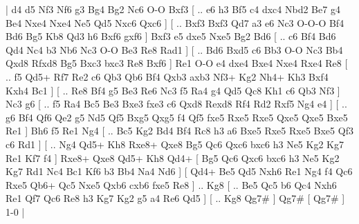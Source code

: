 \makegametitle 
|   d4   d5    Nf3   Nf6    g3   Bg4    Bg2   Nc6    O-O   Bxf3 [ .. e6  h3 Bf5  c4 dxc4  Nbd2 Be7  g4 Be4  Nxe4 Nxe4  Ne5 Qd5  Nxc6 Qxc6   ]  [ .. Bxf3  Bxf3 Qd7  a3 e6  Nc3 O-O-O  Bf4 Bd6  Bg5 Kb8  Qd3 h6  Bxf6 gxf6   ]  Bxf3   e5    dxe5   Nxe5    Bg2   Bd6 [ .. c6  Bf4 Bd6  Qd4 Nc4  b3 Nb6  Nc3 O-O  Be3 Re8  Rad1   ]  [ .. Bd6  Bxd5 c6  Bb3 O-O  Nc3 Bb4  Qxd8 Rfxd8  Bg5 Bxc3  bxc3 Re8  Bxf6   ]  Re1   O-O    e4   dxe4    Bxe4   Nxe4    Rxe4   Re8 [ .. f5  Qd5+ Rf7  Re2 c6  Qb3 Qb6  Bf4 Qxb3  axb3 Nf3+  Kg2 Nh4+  Kh3 Bxf4  Kxh4 Bc1   ]  [ .. Re8  Bf4 g5  Be3 Re6  Nc3 f5  Ra4 g4  Qd5 Qc8  Kh1 c6  Qb3 Nf3   ]  Nc3   g6 [ .. f5  Ra4 Bc5  Be3 Bxe3  fxe3 c6  Qxd8 Rexd8  Rf4 Rd2  Rxf5 Ng4  e4   ]  [ .. g6  Bf4 Qf6  Qe2 g5  Nd5 Qf5  Bxg5 Qxg5  f4 Qf5  fxe5 Rxe5  Rxe5 Qxe5  Qxe5 Bxe5  Re1   ]  Bh6   f5    Re1   Ng4 [ .. Bc5  Kg2 Bd4  Bf4 Rc8  h3 a6  Bxe5 Rxe5  Rxe5 Bxe5  Qf3 c6  Rd1   ]  [ .. Ng4  Qd5+ Kh8  Rxe8+ Qxe8  Bg5 Qc6  Qxc6 bxc6  h3 Ne5  Kg2 Kg7  Re1 Kf7  f4   ]  Rxe8+   Qxe8    Qd5+   Kh8    Qd4+ [  Bg5 Qc6  Qxc6 bxc6  h3 Ne5  Kg2 Kg7  Rd1 Nc4  Bc1 Kf6  b3 Bb4  Na4 Nd6   ]  [  Qd4+ Be5  Qd5 Nxh6  Re1 Ng4  f4 Qc6  Rxe5 Qb6+  Qc5 Nxe5  Qxb6 cxb6  fxe5 Re8   ] .. Kg8    [ .. Be5  Qc5 b6  Qc4 Nxh6  Re1 Qf7  Qc6 Re8  h3 Kg7  Kg2 g5  a4 Re6  Qd5   ]  [ .. Kg8  Qg7#   ]  Qg7#    [  Qg7#   ] 1-0  |
